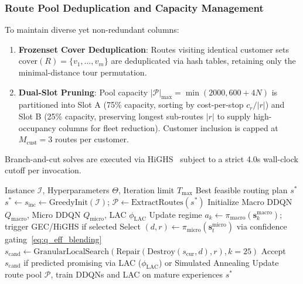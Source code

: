 \documentclass{ieeeaccess}
\begin{document}
\subsubsection{Route Pool Deduplication and Capacity Management}
To maintain diverse yet non-redundant columns:
\begin{enumerate}
    \item \textbf{Frozenset Cover Deduplication}: Routes visiting identical customer sets $\text{cover}(R) = \{v_1, \dots, v_m\}$ are deduplicated via hash tables, retaining only the minimal-distance tour permutation.
    \item \textbf{Dual-Slot Pruning}: Pool capacity $|\mathcal{P}|_{\max} = \min(2000, 600 + 4N)$ is partitioned into Slot A (75\% capacity, sorting by cost-per-stop $c_r / |r|$) and Slot B (25\% capacity, preserving longest sub-routes $|r|$ to supply high-occupancy columns for fleet reduction). Customer inclusion is capped at $M_{\text{cust}} = 3$ routes per customer.
\end{enumerate}
Branch-and-cut solves are executed via HiGHS~\cite{huangfu2018parallelizing} subject to a strict 4.0s wall-clock cutoff per invocation.

\begin{algorithm}[!t]
\caption{Tri-Level Hybrid DDQN-ALNS Overview}
\label{alg:hybrid_ddqn_alns}
\footnotesize
\begin{algorithmic}[1]
\Require Instance $\mathcal{I}$, Hyperparameters $\Theta$, Iteration limit $T_{\max}$
\Ensure Best feasible routing plan $s^*$
\State $s^* \leftarrow s_{\text{inc}} \leftarrow \text{GreedyInit}(\mathcal{I})$; $\mathcal{P} \leftarrow \text{ExtractRoutes}(s^*)$
\State Initialize Macro DDQN $Q_{\text{macro}}$, Micro DDQN $Q_{\text{micro}}$, LAC $\phi_{\text{LAC}}$
     
        \State Update regime $a_k \leftarrow \pi_{\text{macro}}(\mathbf{s}_k^{\text{macro}})$; trigger GEC/HiGHS if selected
    \EndIf
    \State Select $(d, r) \leftarrow \pi_{\text{micro}}(\mathbf{s}_t^{\text{micro}})$ via confidence gating~\eqref{eq:q_eff_blending}
    \State $s_{\text{cand}} \leftarrow \text{GranularLocalSearch}(\text{Repair}(\text{Destroy}(s_{\text{cur}}, d), r), k=25)$
    \State Accept $s_{\text{cand}}$ if predicted promising via LAC ($\phi_{\text{LAC}}$) or Simulated Annealing
    \State Update route pool $\mathcal{P}$, train DDQNs and LAC on mature experiences
\EndFor
\State \Return $s^*$ 
\end{algorithmic}
\end{algorithm}
\end{document}
